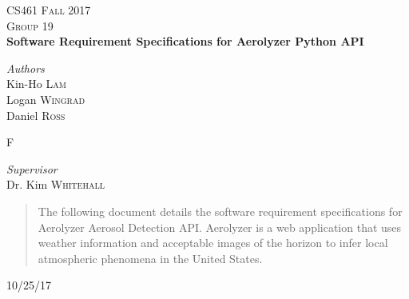 \documentclass[journal,10pt,draftclsnofoot,onecolumn]{IEEEtran}
\begin{document}
\begin{titlepage}
\newcommand{\HRule}{\rule{\linewidth}{0.4mm}}

\center

\textsc{\Large CS461 Fall 2017 }\\[0.5cm]
\textsc{\large Group 19}\\[0.5cm] %

{\huge\bfseries Software Requirement Specifications for Aerolyzer Python API}\\[0.4cm]

\vfill
\begin{minipage}{0.4\textwidth}
\begin{flushleft}
\large
\textit{Authors}\\
Kin-Ho \textsc{Lam}\\
Logan \textsc{Wingrad}\\
Daniel \textsc{Ross}\\
\end{flushleft}F
\end{minipage}
\vfill
\begin{minipage}{0.4\textwidth}
\begin{flushleft}
\large
\textit{Supervisor}\\
Dr. Kim \textsc{Whitehall}
\end{flushleft}
\end{minipage}

\vfill

\begin{abstract}
The following document details the software requirement specifications for Aerolyzer Aerosol Detection API. Aerolyzer is a web application that uses weather information and acceptable images of the horizon to infer local atmospheric phenomena in the United States. 
\end{abstract}

\vfill\vfill\vfill
{\large10/25/17}
\vfill
\end{titlepage}

\tableofcontents
\clearpage
\end{document}
